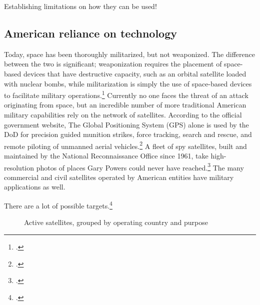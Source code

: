 \documentclass{memoir}
\begin{document}
Establishing limitations on how they can be used!

\subsection{American reliance on technology}
Today, space has been thoroughly militarized, but not weaponized. The difference between the two is significant; weaponization requires the placement of space-based devices that have destructive capacity, such as an orbital satellite loaded with nuclear bombs, while militarization is simply the use of space-based devices to facilitate military operations.\footcite[p.~3]{mowthorpe_militarization_2004} Currently no one faces the threat of an attack originating from space, but an incredible number of more traditional American military capabilities rely on the network of satellites. According to the official government website, The Global Positioning System (GPS) alone is used by the DoD for precision guided munition strikes, force tracking, search and rescue, and remote piloting of unmanned aerial vehicles.\footcite{national_coordination_office_for_space-based_positioning_navigation_and_timing_federal_2018} A fleet of spy satellites, built and maintained by the National Reconnaissance Office since 1961, take high-resolution photos of places Gary Powers could never have reached.\footcite{national_reconnaissance_office_about_2019} The many commercial and civil satellites operated by American entities have military applications as well.


There are a lot of possible targets.\footcite[A few satellites are listed as dual-purpose (i.e. Government/Military), and those are counted twice, once for each purpose. For instance, the data shows that the US is currently operating 830 satellites, while adding up the bars in this chart would give you 966. I made this choice to emphasize the dependency of various social systems on the existing satellite infrastructure.]{union_of_concerned_scientists_ucs_2018}


\begin{figure}[ht]
  \centering
  
  \label{country_sats}
  \caption{Active satellites, grouped by operating country and purpose}
\end{figure}
\end{document}
